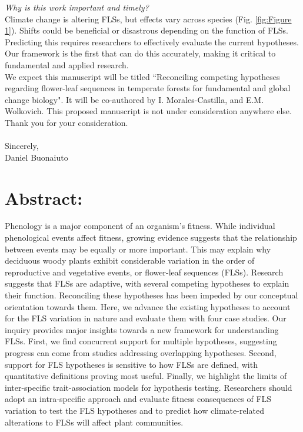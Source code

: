 \documentclass[11pt,a4paper]{article}
\begin{document}
\noindent \emph{Why is this work important and timely?}\\

\noindent Climate change is altering FLSs, but effects vary across species (Fig. \ref{fig:Figure 1}). Shifts could be beneficial or disastrous depending on the function of FLSs. Predicting this requires researchers to effectively evaluate the current hypotheses. Our framework is the first that can do this accurately, making it critical to fundamental and applied research.\\

 \noindent We expect this manuscript will be titled ``Reconciling competing hypotheses regarding flower-leaf sequences in temperate forests for fundamental and global change biology". It will be co-authored by I. Morales-Castilla, and E.M. Wolkovich. This proposed manuscript is not under consideration anywhere else. Thank you for your consideration.\\
\\Sincerely,\\

Daniel Buonaiuto
\newpage
\section*{Abstract:}
Phenology is a major component of an organism's fitness. While individual phenological events affect fitness, growing evidence suggests that the relationship between events may be equally or more important. This may explain why deciduous woody plants exhibit considerable variation in the order of reproductive and vegetative events, or flower-leaf sequences (FLSs). Research suggests that FLSs are adaptive, with several competing hypotheses to explain their function. Reconciling these hypotheses has been impeded by our conceptual orientation towards them. Here, we advance the existing hypotheses to account for the FLS variation in nature and evaluate them with four case studies. Our inquiry provides major insights towards a new framework for understanding FLSs. First, we find concurrent support for multiple hypotheses, suggesting progress can come from studies addressing overlapping hypotheses. Second, support for FLS hypotheses is sensitive to how FLSs are defined, with quantitative definitions proving most useful. Finally, we highlight the limits of inter-specific trait-association models for hypothesis testing. Researchers should adopt an intra-specific approach and evaluate fitness consequences of FLS variation to test the FLS hypotheses and to predict how climate-related alterations to FLSs will affect plant communities. %
\end{document}

